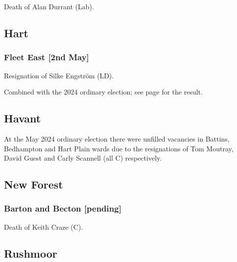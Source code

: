 \documentclass[a4paper,openany]{book}
\begin{document}
\begin{resultsiii}
Death of Alan Durrant (Lab).

\subsection*{Hart}

\subsubsection*{Fleet East \hspace*{\fill}\nolinebreak[1]%
	\enspace\hspace*{\fill}
	[2nd May]}


Resignation of Silke Engström (LD).

Combined with the 2024 ordinary election; see page \pageref{HartFleetEast} for the result.

\subsection*{Havant}

At the May 2024 ordinary election there were unfilled vacancies in Battins, Bedhampton and Hart Plain wards due to the resignations of Tom Moutray, David Guest and Carly Scannell (all C) respectively.%

\subsection*{New Forest}

\subsubsection*{Barton and Becton \hspace*{\fill}\nolinebreak[1]%
	\enspace\hspace*{\fill}
	[pending]}


Death of Keith Craze (C).

\subsection*{Rushmoor}


\end{resultsiii}
\end{document}

